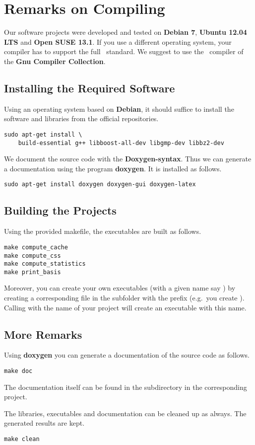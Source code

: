 \section{Remarks on Compiling}
\label{program:compiling}

Our software projects were developed and tested on {\bf Debian 7}, {\bf Ubuntu 12.04 LTS} and {\bf Open SUSE 13.1}.
If you use a different operating system, your compiler has to support the full \cppeleven\ standard.
We suggest to use the \cpp\ compiler of the {\bf Gnu Compiler Collection}.

\subsection{Installing the Required Software}
Using an operating system based on {\bf Debian}, it should suffice to install the software and libraries from the official repositories.
\begin{lstlisting}
sudo apt-get install \
    build-essential g++ libboost-all-dev libgmp-dev libbz2-dev
\end{lstlisting}
We document the source code with the {\bf Doxygen-syntax}.
Thus we can generate a documentation using the program {\bf doxygen}.
It is installed as follows.
\begin{lstlisting}
sudo apt-get install doxygen doxygen-gui doxygen-latex
\end{lstlisting}

\subsection{Building the Projects}
Using the provided makefile, the executables are built as follows.
\begin{lstlisting}
make compute_cache
make compute_css
make compute_statistics
make print_basis
\end{lstlisting}
Moreover, you can create your own executables (with a given name say )
by creating a corresponding \progname{.cpp} file in the subfolder \progname{./kappa} with the prefix  (e.g.\ you create ).
Calling \progname{make} with the name of your project will create an executable with this name.

\subsection{More Remarks}
Using {\bf doxygen} you can generate a documentation of the source code as follows. 
\begin{lstlisting}
make doc
\end{lstlisting}
The documentation itself can be found in the subdirectory  in the corresponding project.

The libraries, executables and documentation can be cleaned up as always.
The generated results are kept.
\begin{lstlisting}
make clean
\end{lstlisting}
